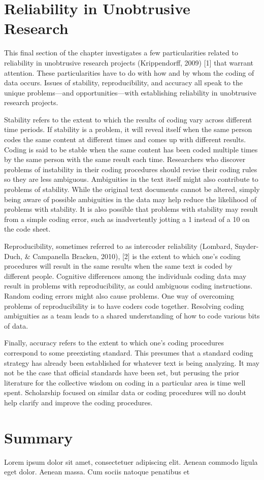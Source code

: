 \section{Reliability in Unobtrusive Research}

This final section of the chapter investigates a few particularities related to reliability in unobtrusive research projects (Krippendorff, 2009) [1] that warrant attention. These particularities have to do with how and by whom the coding of data occurs. Issues of stability, reproducibility, and accuracy all speak to the unique problems—and opportunities—with establishing reliability in unobtrusive research projects.

Stability refers to the extent to which the results of coding vary across different time periods. If stability is a problem, it will reveal itself when the same person codes the same content at different times and comes up with different results. Coding is said to be stable when the same content has been coded multiple times by the same person with the same result each time. Researchers who discover problems of instability in their coding procedures should revise their coding rules so they are less ambiguous. Ambiguities in the text itself might also contribute to problems of stability. While the original text documents cannot be altered, simply being aware of possible ambiguities in the data may help reduce the likelihood of problems with stability. It is also possible that problems with stability may result from a simple coding error, such as inadvertently jotting a 1 instead of a 10 on the code sheet.

Reproducibility, sometimes referred to as intercoder reliability (Lombard, Snyder-Duch, \& Campanella Bracken, 2010), [2] is the extent to which one's coding procedures will result in the same results when the same text is coded by different people. Cognitive differences among the individuals coding data may result in problems with reproducibility, as could ambiguous coding instructions. Random coding errors might also cause problems. One way of overcoming problems of reproducibility is to have coders code together. Resolving coding ambiguities as a team leads to a shared understanding of how to code various bits of data.

Finally, accuracy refers to the extent to which one's coding procedures correspond to some preexisting standard. This presumes that a standard coding strategy has already been established for whatever text is being analyzing. It may not be the case that official standards have been set, but perusing the prior literature for the collective wisdom on coding in a particular area is time well spent. Scholarship focused on similar data or coding procedures will no doubt help clarify and improve the coding procedures.

\section{Summary}\label{ch12:summary}

Lorem ipsum dolor sit amet, consectetuer adipiscing elit. Aenean commodo ligula eget dolor. Aenean massa. Cum sociis natoque penatibus et
